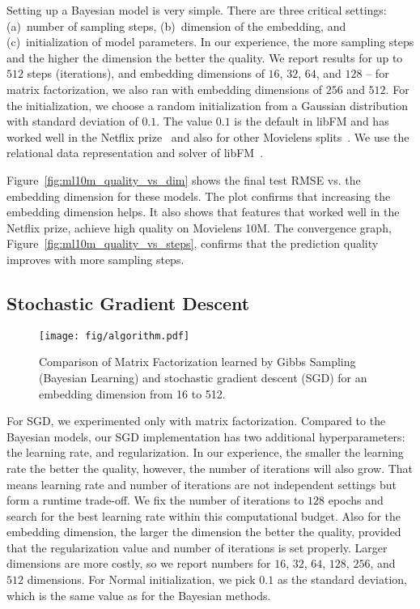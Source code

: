 \documentclass{article}
\begin{document}
Setting up a Bayesian model is very simple.
There are three critical settings: (a)~number of sampling steps, (b)~dimension of the embedding, and (c)~initialization of model parameters.
In our experience, the more sampling steps and the higher the dimension the better the quality.
We report results for up to $512$ steps (iterations), and embedding dimensions of $16$, $32$, $64$, and $128$ -- for matrix factorization, we also ran with embedding dimensions of $256$ and $512$.
For the initialization, we choose a random initialization from a Gaussian distribution with standard deviation of $0.1$.
The value $0.1$ is the default in libFM and has worked well in the Netflix prize~\cite{rendle:vldb13} and also for other Movielens splits~\cite{yamada:kdd17}.
We use the relational data representation and solver of libFM~\cite{rendle:vldb13}.

Figure~\ref{fig:ml10m_quality_vs_dim} shows the final test RMSE vs. the embedding dimension for these models.
The plot confirms that increasing the embedding dimension helps.
It also shows that features that worked well in the Netflix prize, achieve high quality on Movielens 10M.
The convergence graph, Figure~\ref{fig:ml10m_quality_vs_steps}, confirms that the prediction quality improves with more sampling steps.



\subsection{Stochastic Gradient Descent}

\begin{figure}[t]
    \centering
    \texttt{[image: fig/algorithm.pdf]}
    \caption{Comparison of Matrix Factorization learned by Gibbs Sampling (Bayesian Learning) and stochastic gradient descent (SGD) for an embedding dimension from 16 to 512.}
    \label{fig:ml10m_algorithm}
\end{figure}
For SGD, we experimented only with matrix factorization.
Compared to the Bayesian models, our SGD implementation has two additional hyperparameters: the learning rate, and regularization.
In our experience, the smaller the learning rate the better the quality, however, the number of iterations will also grow.
That means learning rate and number of iterations are not independent settings but form a runtime trade-off.
We fix the number of iterations to $128$ epochs and search for the best learning rate within this computational budget.
Also for the embedding dimension, the larger the dimension the better the quality, provided that the regularization value and number of iterations is set properly.
Larger dimensions are more costly, so we report numbers for $16$, $32$, $64$, $128$, $256$, and $512$ dimensions.
For Normal initialization, we pick $0.1$ as the standard deviation, which is the same value as for the Bayesian methods.
\end{document}
